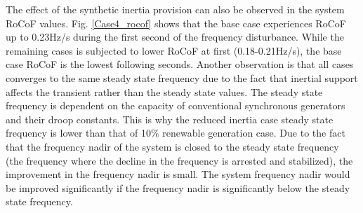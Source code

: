 The effect of the synthetic inertia provision can also be observed in the system RoCoF values. Fig. \ref{Case4_rocof} shows that the base case experiences RoCoF up to 0.23Hz/s during the first second of the frequency disturbance. While the remaining cases is subjected to lower RoCoF at first (0.18-0.21Hz/s), the base case RoCoF is the lowest following seconds. Another observation is that all cases converges to the same steady state frequency due to the fact that inertial support affects the transient rather than the steady state values. The steady state frequency is dependent on the capacity of conventional synchronous generators and their droop constants. This is why the reduced inertia case steady state frequency is lower than that of 10\% renewable generation case. Due to the fact that the frequency nadir of the system is closed to the steady state frequency (the frequency where the decline in the frequency is arrested and stabilized), the improvement in the frequency nadir is small. The system frequency nadir would be improved significantly if the frequency nadir is significantly below the steady state frequency. 
